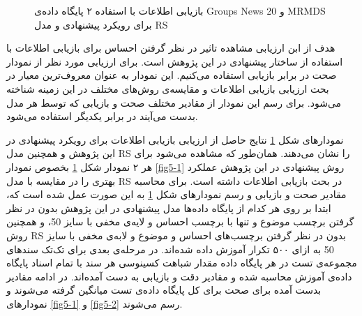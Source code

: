 \documentclass[12pt,a4paper]{article}
\begin{document}
\begin{figure}[!t]
	\centering
	\caption{بازیابی اطلاعات با استفاده ۲ پایگاه داده‌ی Groups News 20 و MRMDS برای رویکرد پیشنهادی و مدل RS}
	\label{fig5}
\end{figure}

هدف از ابن ارزیابی مشاهده تاثیر در نظر گرفتن احساس برای بازیابی اطلاعات با استفاده از ساختار پیشنهادی در این پژوهش است. برای ارزیابی مورد نظر از نمودار صحت در برابر بازیابی استفاده می‌‌کنیم. این نمودار به عنوان معروف‌ترین معیار در بحث ارزیابی بازیابی اطلاعات و مقایسه‌ی روش‌های مختلف در این زمینه شناخته می‌‌شود. برای رسم این نمودار از مقادیر مختلف صحت و بازیابی که توسط هر مدل بدست می‌‌آیند در برابر یکدیگر استفاده می‌‌شود.

نمودار‌های شکل
\ref{fig5}
نتایج حاصل از ارزیابی بازیابی اطلاعات برای رویکرد پیشنهادی در این پژوهش و همچنین مدل RS را نشان می‌‌دهند. همان‌طور که مشاهده می‌‌شود برای هر ۲ نمودار شکل
\ref{fig5}
بخصوص نمودار
\ref{fig5-1}
روش پیشنهادی در این پژوهش عملکرد بهتری را در مقایسه با مدل RS در بحث بازیابی اطلاعات داشته است. برای محاسبه مقادیر صحت و بازیابی و رسم نمودار‌های شکل
\ref{fig5}
به این صورت عمل شده است که، ابتدا بر روی هر کدام از پایگاه داده‌ها مدل پیشنهادی در این پژوهش بدون در نظر گرفتن برچسب موضوع و تنها با برچسب احساس و لایه‌ی مخفی با سایز 50، و همچنین روش RS
بدون در نظر گرفتن برچسب‌های احساس و موضوع و لابه‌ی مخفی با سایز 50 به ازای ۵۰۰ تکرار آموزش داده شده‌اند. در مرحله‌ی بعدی برای تک‌تک سند‌های مجموعه‌ی تست در هر پایگاه داده مقدار شباهت کسینوسی هر سند با تمام اسناد پایگاه داده‌ی آموزش محاسبه شده و مقادیر دقت و بازیابی به دست آمده‌اند. در ادامه مقادیر بدست آمده برای صحت برای کل پایگاه داده‌ی تست میانگین گرفته می‌‌شوند و نمودار‌های
\ref{fig5-1}
و
\ref{fig5-2}
رسم می‌‌شوند.
\end{document}
